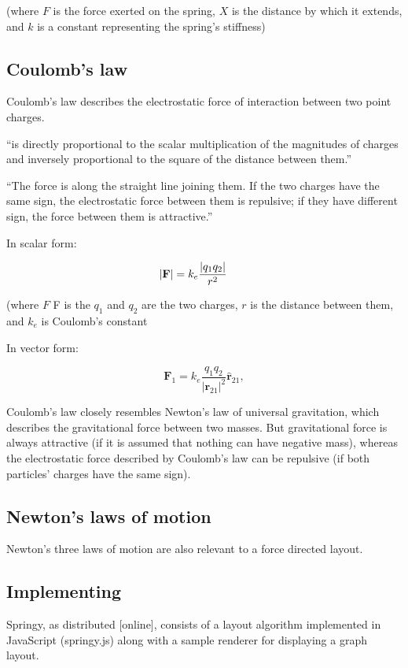 (where $F$ is the force exerted on the spring, $X$ is the distance by which it extends, and $k$ is a constant representing the spring's stiffness)

\subsection{Coulomb's law}

Coulomb's law describes the electrostatic force of interaction between two point charges.

``is directly proportional to the scalar multiplication of the magnitudes of charges and inversely proportional to the square of the distance between them.''

``The force is along the straight line joining them. If the two charges have the same sign, the electrostatic force between them is repulsive; if they have different sign, the force between them is attractive.'' 

In scalar form:

$$
|\mathbf F|=k_e{|q_1q_2|\over r^2}\qquad
$$

(where $F$ F is the $q_1$ and $q_2$ are the two charges, $r$ is the distance between them, and $k_e$ is Coulomb's constant 

In vector form:

$$
\qquad\mathbf F_1=k_e\frac{q_1q_2}{{|\mathbf r_{21}|}^2} \mathbf{\hat{r}}_{21},\qquad
$$


Coulomb's law closely resembles Newton's law of universal gravitation, which describes the gravitational force between two masses.
But gravitational force is always attractive (if it is assumed that nothing can have negative mass), whereas the electrostatic force described by Coulomb's law can be repulsive (if both particles' charges have the same sign).

\subsection{Newton's laws of motion}

Newton's three laws of motion are also relevant to a force directed layout.

\subsection{Implementing }

Springy, as distributed [online], consists of a layout algorithm implemented in JavaScript (springy.js) along with a sample renderer for displaying a graph layout.

